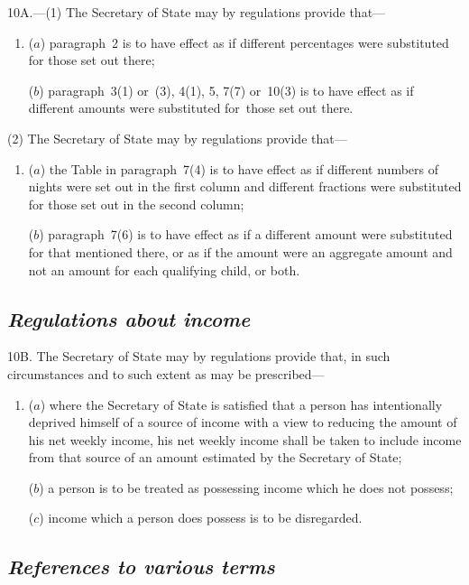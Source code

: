 \documentclass[12pt,a4paper]{article}
\begin{document}
10A.---(1) The Secretary of State may by regulations provide that—
\begin{enumerate}\item[]
($a$) paragraph~2 is to have effect as if different percentages were substituted for those set out there;

($b$) paragraph~3(1)  or~(3), 4(1), 5, 7(7)  or~10(3)  is to have effect as if different amounts were substituted for~those set out there.
\end{enumerate}

(2) The Secretary of State may by regulations provide that—
\begin{enumerate}\item[]
($a$) the Table in paragraph~7(4)  is to have effect as if different numbers of nights were set out in the first column and different fractions were substituted for those set out in the second column;

($b$) paragraph~7(6)  is to have effect as if a different amount were substituted for that mentioned there, or as if the amount were an aggregate amount and not an amount for each qualifying child, or both.
\end{enumerate}

\subsection*{\itshape Regulations about income}

10B. The Secretary of State may by regulations provide that, in such circumstances and to such extent as may be prescribed—
\begin{enumerate}\item[]
($a$) where the Secretary of State is satisfied that a person has intentionally deprived himself of a source of income with a view to reducing the amount of his net weekly income, his net weekly income shall be taken to include income from that source of an amount estimated by the Secretary of State;

($b$) a person is to be treated as possessing income which he does not possess;

($c$) income which a person does possess is to be disregarded.
\end{enumerate}

\subsection*{\itshape References to various terms}
\end{document}
